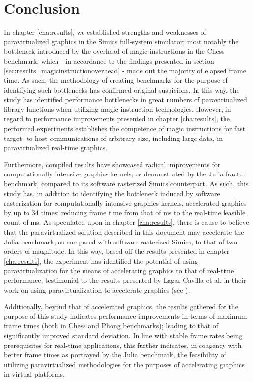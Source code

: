 
\section{Conclusion}
\label{sec:conclusion}

In chapter \ref{cha:results}, we established strengths and weaknesses of paravirtualized graphics in the Simics full-system simulator; most notably the bottleneck introduced by the overhead of magic instructions in the Chess benchmark, which - in accordance to the findings presented in section \ref{sec:results_magicinstructionoverhead} - made out the majority of elapsed frame time.
As such, the methodology of creating benchmarks for the purpose of identifying such bottlenecks has confirmed original suspicions.
In this way, the study has identified performance bottlenecks in great numbers of paravirtualized library functions when utilizing magic instruction technologies.
However, in regard to performance improvements presented in chapter \ref{cha:results}, the performed experiments establishes the competence of magic instructions for fast target -to-host communications of arbitrary size, including large data, in paravirtualized real-time graphics.

Furthermore, compiled results have showcased radical improvements for computationally intensive graphics kernels, as demonstrated by the Julia fractal benchmark, compared to its software rasterized Simics counterpart.
As such, this study has, in addition to identifying the bottleneck induced by software rasterization for computationally intensive graphics kernels, accelerated graphics by up to $34$ times; reducing frame time from that of  ms to the real-time feasible count of  ms.
As speculated upon in chapter \ref{cha:results}, there is cause to believe that the paravirtualized solution described in this document may accelerate the Julia benchmark, as compared with software rasterized Simics, to that of two orders of magnitude.
In this way, based off the results presented in chapter \ref{cha:results}, the experiment has identified the potential of using paravirtualization for the means of accelerating graphics to that of real-time performance; testimonial to the results presented by Lagar-Cavilla et al. in their work on using paravirtualization to accelerate graphics (see ).

Additionally, beyond that of accelerated graphics, the results gathered for the purpose of this study indicates performance improvements in terms of maximum frame times (both in Chess and Phong benchmarks); leading to that of significantly improved standard deviation.
In line with stable frame rates being prerequisites for real-time applications, this further indicates, in coagency with better frame times as portrayed by the Julia benchmark, the feasibility of utilizing paravirtualized methodologies for the purposes of accelerating graphics in virtual platforms.

